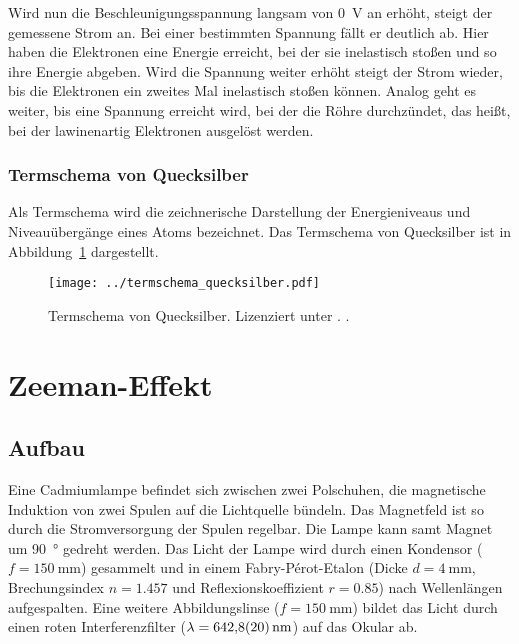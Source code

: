 Wird nun die Beschleunigungsspannung langsam von \SI{0}{\volt} an erhöht, steigt
der gemessene Strom an. Bei einer bestimmten Spannung fällt er deutlich ab.
Hier haben die Elektronen eine Energie erreicht, bei der sie inelastisch stoßen
und so ihre Energie abgeben. Wird die Spannung weiter erhöht steigt der Strom
wieder, bis die Elektronen ein zweites Mal inelastisch stoßen können. Analog
geht es weiter, bis eine Spannung erreicht wird, bei der die Röhre durchzündet,
das heißt, bei der lawinenartig Elektronen ausgelöst werden.

\subsection{Termschema von Quecksilber}

Als Termschema wird die zeichnerische Darstellung der Energieniveaus und
Niveauübergänge eines Atoms bezeichnet. Das Termschema von Quecksilber ist in
Abbildung~\ref{fig:Termschema} dargestellt.

\begin{figure}[htbp]
    \centering
    \texttt{[image: ../termschema\_quecksilber.pdf]}
    \caption{%
        Termschema von Quecksilber. Lizenziert unter \ccbyncsa.
        \parencite{Kraehling/Termschema_Quecksilber}.
    }
    \label{fig:Termschema}
\end{figure}

\chapter{Zeeman-Effekt}

\section{Aufbau}

Eine Cadmiumlampe befindet sich zwischen zwei Polschuhen, die magnetische
Induktion von zwei Spulen auf die Lichtquelle bündeln. Das Magnetfeld ist so
durch die Stromversorgung der Spulen regelbar. Die Lampe kann samt Magnet um
\SI{90}{\degree} gedreht werden. Das Licht der Lampe wird durch einen
Kondensor ($f = \SI{150}{\milli\meter}$) gesammelt und in einem
Fabry-Pérot-Etalon (Dicke $d = \SI{4}{\milli\meter}$, Brechungsindex $n =
\num{1.457}$ und Reflexionskoeffizient $r = \num{0.85}$) nach Wellenlängen
aufgespalten. Eine weitere Abbildungslinse ($f = \SI{150}{\milli\meter}$)
bildet das Licht durch einen roten Interferenzfilter ($\lambda = \SI{642.8 +-
2.0}{\nano\meter}$) auf das Okular ab.

